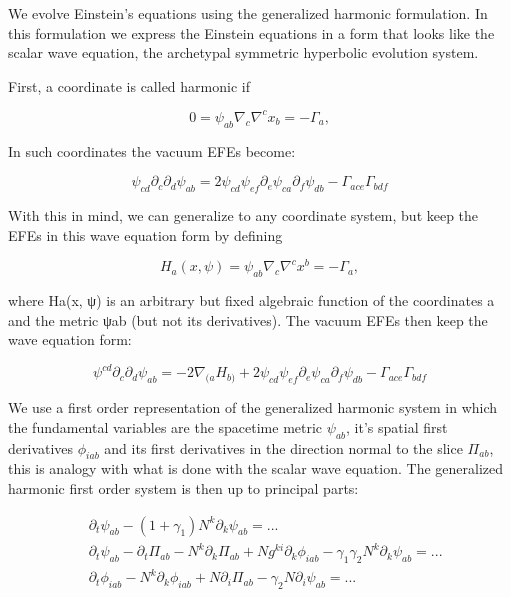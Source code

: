 \documentclass{ut-thesis}
\begin{document}
\newpage

We evolve Einstein's equations using the generalized harmonic formulation. In this formulation we express the Einstein equations in a form that looks like the scalar wave equation, the archetypal symmetric hyperbolic evolution system.

First, a coordinate is called harmonic if

\begin{equation}
0 = \psi_{ab}\nabla_c\nabla^cx_b = -\Gamma_a,
\end{equation}

In such coordinates the vacuum EFEs become:

\begin{equation}
  \psi_{cd}\partial_c\partial_d\psi_{ab} = 2 \psi_{cd}\psi_{ef}\partial_e\psi_{ca}\partial_f\psi_{db} - \Gamma_{ace}\Gamma_{bdf}
\end{equation}

With this in mind, we can generalize to any coordinate system, but keep the EFEs in this wave equation form by defining

\begin{equation}
  H_a(x, \psi) = \psi_{ab}\nabla_c\nabla^cx^b = -\Gamma_a,
\end{equation}

where Ha(x, ψ) is an arbitrary but fixed algebraic function of the coordinates a and the metric ψab (but not its derivatives). The vacuum EFEs then keep the wave equation form:

\begin{equation}
\psi^{cd}\partial_c\partial_d\psi_{ab} = - 2\nabla_{(a}H_{b)} + 2\psi_{cd}\psi_{ef}\partial_e\psi_{ca}\partial_f\psi_{db} - \Gamma_{ace}\Gamma_{bdf}
\end{equation}

We use a first order representation of the generalized harmonic system in which the fundamental variables are the spacetime metric $\psi_{ab}$, it's spatial first derivatives $\phi_{iab}$ and its first derivatives in the direction normal to the slice $\Pi_{ab}$, this is analogy with what is done with the scalar wave equation. The generalized harmonic first order system is then up to principal parts:

\begin{align}
  &\partial_t\psi_{ab} - (1 + \gamma_1)N^k\partial_k\psi_{ab} = ...\\
  &\partial_t\psi_{ab} - \partial_t\Pi_{ab} - N^k\partial_k\Pi_{ab} + Ng^{ki}\partial_k\phi_{iab} - \gamma_1\gamma_2N^k\partial_k\psi_{ab} = ...\\
  &\partial_t\phi_{iab} - N^k\partial_k\phi_{iab} + N\partial_i\Pi_{ab} - \gamma_2N\partial_i\psi_{ab} = ... \\
\end{align}
\end{document}
